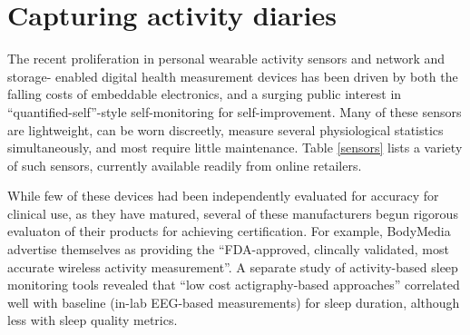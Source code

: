 \documentclass{chi-ext}
\begin{document}
\vspace{6cm}

\section{Capturing activity diaries}

The recent proliferation in personal wearable activity sensors and
network and storage- enabled digital health measurement devices has
been driven by both the falling costs of embeddable electronics, and a
surging public interest in ``quantified-self''-style self-monitoring
for self-improvement.  Many of these sensors are lightweight, can be
worn discreetly, measure several physiological statistics
simultaneously, and most require little maintenance. Table
\ref{sensors} lists a variety of such sensors, currently available
readily from online retailers.

While few of these devices had been independently evaluated for
accuracy for clinical use, as they have matured, several of these
manufacturers begun rigorous evaluaton of their products for achieving
certification. For example, BodyMedia advertise themselves as
providing the ``FDA-approved, clincally validated, most accurate
wireless activity measurement''.  A separate study of activity-based
sleep monitoring tools revealed that ``low cost actigraphy-based
approaches'' correlated well with baseline (in-lab EEG-based
measurements) for sleep duration, although less with sleep quality
metrics.
\end{document}
